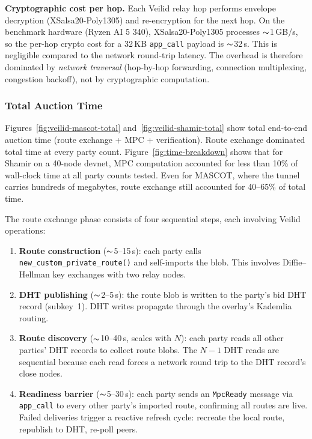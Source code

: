 \textbf{Cryptographic cost per hop.}  Each Veilid relay hop performs
envelope decryption (XSalsa20-Poly1305) and re-encryption for the next hop.
On the benchmark hardware (Ryzen AI 5 340), XSalsa20-Poly1305 processes
${\thicksim}$1\,GB/s, so the per-hop crypto cost for a 32\,KB \texttt{app\_call}
payload is ${\thicksim}$32\,\textmu{}s. This is negligible compared to the network
round-trip latency.  The overhead is therefore dominated by \emph{network
traversal} (hop-by-hop forwarding, connection multiplexing, congestion
backoff), not by cryptographic computation.

\subsubsection{Total Auction Time}

Figures~\ref{fig:veilid-mascot-total} and~\ref{fig:veilid-shamir-total} show
total end-to-end auction time (route exchange + MPC + verification).
Route exchange dominated total time at every party count.
Figure~\ref{fig:time-breakdown} shows that for Shamir on a 40-node devnet,
MPC computation accounted for less than 10\% of wall-clock time at all party
counts tested.  Even for MASCOT, where the tunnel carries hundreds of
megabytes, route exchange still accounted for 40--65\% of total time.

The route exchange phase consists of four sequential steps, each involving
Veilid operations:
\begin{enumerate}[noitemsep]
  \item \textbf{Route construction} (${\thicksim}$5--15\,s): each party calls
    \texttt{new\_custom\_private\_route()} and self-imports the blob.  This
    involves Diffie--Hellman key exchanges with two relay nodes.
  \item \textbf{DHT publishing} (${\thicksim}$2--5\,s): the route blob is
    written to the party's bid DHT record (subkey~1).  DHT writes
    propagate through the overlay's Kademlia routing.
  \item \textbf{Route discovery} (${\thicksim}$10--40\,s, scales with $N$):
    each party reads all other parties' DHT records to collect route blobs.
    The $N{-}1$ DHT reads are sequential because each read forces a network
    round trip to the DHT record's close nodes.
  \item \textbf{Readiness barrier} (${\thicksim}$5--30\,s): each party sends an
    \texttt{MpcReady} message via \texttt{app\_call} to every other party's
    imported route, confirming all routes are live.  Failed deliveries trigger
    a reactive refresh cycle: recreate the local route, republish to DHT,
    re-poll peers.
\end{enumerate}

